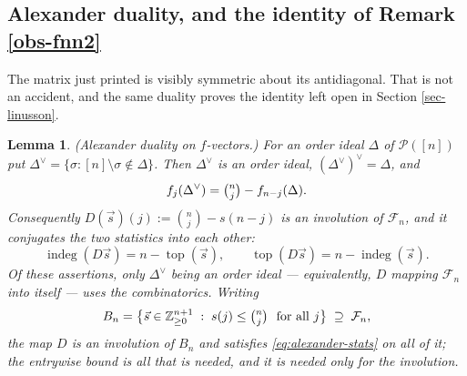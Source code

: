 \documentclass[11pt, a4paper, abstract=yes]{scrartcl}
\theoremstyle{definition}
\theoremstyle{remark}
\theoremstyle{plain}
\newtheorem{lemma}[definition]{Lemma}
\newcommand{\indeg}{\operatorname{indeg}}
\newcommand{\tp}{\operatorname{top}}
\begin{document}
\subsection{Alexander duality, and the identity of Remark \ref{obs-fnn2}}
\label{sec:org587bd3c}

The matrix just printed is visibly symmetric about its antidiagonal. That is not an accident, and
the same duality proves the identity left open in Section \ref{sec-linusson}.

\begin{lemma}
(\emph{Alexander duality on \(f\)-vectors.}) For an order ideal \(\Delta\) of \(\mathcal P([n])\) put
\(\Delta^{\vee}=\lbrace\sigma:[n]\setminus\sigma\notin\Delta\rbrace\). Then \(\Delta^{\vee}\) is an
order ideal, \((\Delta^{\vee})^{\vee}=\Delta\), and
\begin{equation}\label{eq:alexander-f}
  f_j(\Delta^{\vee})=\tbinom nj-f_{n-j}(\Delta).
\end{equation}
Consequently \(D(\vec s)(j):=\binom nj-s(n-j)\) is an involution of \(\mathcal F_n\), and it conjugates
the two statistics into each other:
\begin{equation}\label{eq:alexander-stats}
  \indeg(D\vec s)=n-\tp(\vec s),\qquad \tp(D\vec s)=n-\indeg(\vec s).
\end{equation}
Of these assertions, only \(\Delta^{\vee}\) being an order ideal --- equivalently, \(D\) mapping
\(\mathcal F_n\) into itself --- uses the combinatorics. Writing
\begin{equation}\label{eq:binomial-box}
  B_n=\bigl\lbrace\vec s\in\mathbb Z_{\ge0}^{n+1}\;:\;s(j)\le\tbinom nj\ \text{ for all }j\bigr\rbrace
  \;\supseteq\;\mathcal F_n ,
\end{equation}
the map \(D\) is an involution of \(B_n\) and satisfies \eqref{eq:alexander-stats} on all of it; the
entrywise bound is all that is needed, and it is needed only for the involution.
\label{lem-alexander}
\end{lemma}
\end{document}
